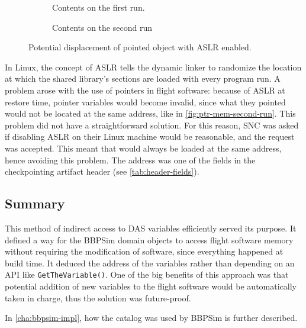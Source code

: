 {\begin{figure}[htbp]
	\centering
	\begin{subfigure}[t]{.58\linewidth}
		\small
		\centering
		
		\caption{Contents on the first run.}
		\label{fig:ptr-mem-first-run}
	\end{subfigure}%
	\begin{subfigure}[t]{.38\linewidth}
		\small
		\centering
		
		\caption{Contents on the second run}
		\label{fig:ptr-mem-second-run}
	\end{subfigure}
	\caption{Potential displacement of pointed object with ASLR enabled.}
	\label{fig:mem-displacement}
\end{figure}

In Linux, the concept of \gls{ASLR} tells the dynamic linker to randomize the location at which the shared library's sections are loaded with every program run. A problem arose with the use of pointers in flight software: because of ASLR at restore time, pointer variables would become invalid, since what they pointed would not be located at the same address, like in  \autoref{fig:ptr-mem-second-run}. This problem did not have a straightforward solution. For this reason, \gls{SNC} was asked if disabling \gls{ASLR} on their Linux machine would be reasonable, and the request was accepted. This meant that  would always be loaded at the same address, hence avoiding this problem. The address was one of the fields in the checkpointing artifact header (see \autoref{tab:header-fields}).

\subsection*{Summary}
This method of indirect access to DAS variables efficiently served its purpose. It defined a way for the BBPSim domain objects to access flight software memory without requiring the modification of software, since everything happened at build time. It deduced the address of the variables rather than depending on an API like \texttt{GetTheVariable()}. One of the big benefits of this approach was that potential addition of new variables to the flight software would be automatically taken in charge, thus the solution was future-proof.

In \autoref{cha:bbpsim-impl}, how the catalog was used by \gls{BBPSim} is further described.
}